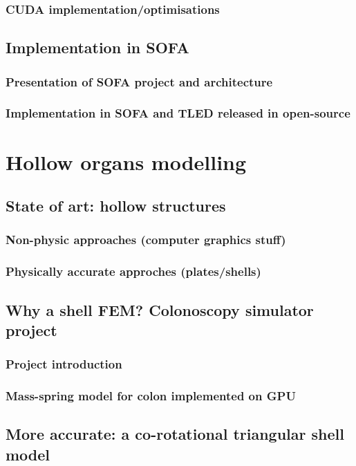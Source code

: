 		\section{CUDA implementation/optimisations }

	\chapter{Implementation in SOFA}
		\section{Presentation of SOFA project and architecture}
		\section{Implementation in SOFA and TLED released in open-source}



\part{Hollow organs modelling}

	\chapter{State of art: hollow structures}
		\section{Non-physic approaches (computer graphics stuff)}
		\section{Physically accurate approches (plates/shells)}

	\chapter{Why a shell FEM? Colonoscopy simulator project}
		\section{Project introduction}
		\section{Mass-spring model for colon implemented on GPU }

	\chapter{More accurate: a co-rotational triangular shell model }
